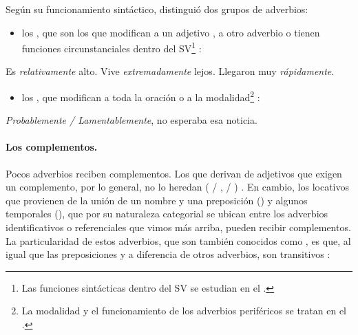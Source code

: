 Según su funcionamiento sintáctico, \textcite[724]{kovacci1999} distinguió dos
grupos de adverbios:

\begin{itemize}
  \item los , que son los que modifican a un
        adjetivo , a otro adverbio
         o tienen funciones circunstanciales dentro del
        SV\footnote{Las funciones sintácticas dentro del SV se estudian en el
        .} :
\end{itemize}

\begin{exe}
  \ex\label{ex:05-nucleares}
    \begin{xlist}
      \ex\label{ex:05-nucleares-a} Es \textit{relativamente} alto.
      \ex\label{ex:05-nucleares-b} Vive \textit{extremadamente} lejos.
      \ex\label{ex:05-nucleares-c} Llegaron muy \textit{rápidamente}.
    \end{xlist}
\end{exe}

\begin{itemize}
  \item los , que modifican a toda la oración o a
        la modalidad\footnote{La modalidad y el funcionamiento de los adverbios
        periféricos se tratan en el .} :
\end{itemize}

\begin{exe}
  \ex\label{ex:05-perifericos} \textit{Probablemente / Lamentablemente}, no
      esperaba esa noticia.
\end{exe}

\paragraph{Los complementos.} Pocos adverbios reciben complementos. Los que
derivan de adjetivos que exigen un complemento, por lo general, no lo heredan
( / ,
 / )
\parencite{giammatteo2023a}. En cambio, los locativos que provienen de la unión
de un nombre y una preposición () y algunos
temporales (), que por su naturaleza categorial se ubican
entre los adverbios identificativos o referenciales que vimos más arriba, pueden
recibir complementos. La particularidad de estos adverbios, que son también
conocidos como , es que, al igual que las
preposiciones y a diferencia de otros adverbios, son transitivos
\parencite{giammatteo2013}:

